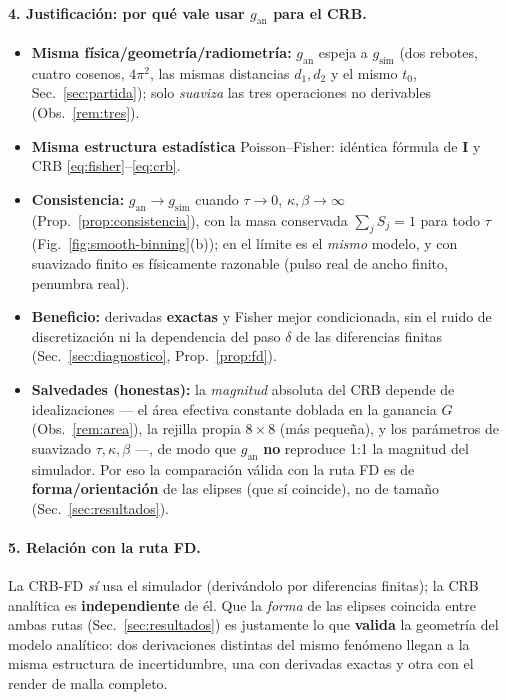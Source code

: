 \documentclass[11pt,a4paper]{article}
\theoremstyle{plain}
\theoremstyle{definition}
\newcommand{\matr}[1]{\mathbf{#1}}
\begin{document}
\paragraph{4. Justificaci\'on: por qu\'e vale usar $g_{\mathrm{an}}$ para el CRB.}
\begin{itemize}[nosep]
    \item \textbf{Misma f\'isica/geometr\'ia/radiometr\'ia:} $g_{\mathrm{an}}$
    espeja a $g_{\mathrm{sim}}$ (dos rebotes, cuatro cosenos, $4\pi^2$, las mismas
    distancias $d_1,d_2$ y el mismo $t_0$, Sec.~\ref{sec:partida}); solo
    \emph{suaviza} las tres operaciones no derivables (Obs.~\ref{rem:tres}).
    \item \textbf{Misma estructura estad\'istica} Poisson--Fisher: id\'entica
    f\'ormula de $\matr I$ y CRB \eqref{eq:fisher}--\eqref{eq:crb}.
    \item \textbf{Consistencia:} $g_{\mathrm{an}}\to g_{\mathrm{sim}}$ cuando
    $\tau\to0$, $\kappa,\beta\to\infty$ (Prop.~\ref{prop:consistencia}), con la
    masa conservada $\sum_j S_j=1$ para todo $\tau$
    (Fig.~\ref{fig:smooth-binning}(b)); en el l\'imite es el \emph{mismo} modelo,
    y con suavizado finito es f\'isicamente razonable (pulso real de ancho finito,
    penumbra real).
    \item \textbf{Beneficio:} derivadas \textbf{exactas} y Fisher mejor
    condicionada, sin el ruido de discretizaci\'on ni la dependencia del paso
    $\delta$ de las diferencias finitas (Sec.~\ref{sec:diagnostico},
    Prop.~\ref{prop:fd}).
    \item \textbf{Salvedades (honestas):} la \emph{magnitud} absoluta del CRB
    depende de idealizaciones --- el \'area efectiva constante doblada en la
    ganancia $G$ (Obs.~\ref{rem:area}), la rejilla propia $8\times8$ (m\'as
    peque\~na), y los par\'ametros de suavizado $\tau,\kappa,\beta$ ---, de modo que
    $g_{\mathrm{an}}$ \textbf{no} reproduce 1:1 la magnitud del simulador. Por eso
    la comparaci\'on v\'alida con la ruta FD es de \textbf{forma/orientaci\'on} de
    las elipses (que s\'i coincide), no de tama\~no (Sec.~\ref{sec:resultados}).
\end{itemize}

\paragraph{5. Relaci\'on con la ruta FD.} La CRB-FD \emph{s\'i} usa el simulador
(deriv\'andolo por diferencias finitas); la CRB anal\'itica es \textbf{independiente}
de \'el. Que la \emph{forma} de las elipses coincida entre ambas rutas
(Sec.~\ref{sec:resultados}) es justamente lo que \textbf{valida} la geometr\'ia del
modelo anal\'itico: dos derivaciones distintas del mismo fen\'omeno llegan a la
misma estructura de incertidumbre, una con derivadas exactas y otra con el
render de malla completo.
\end{document}
